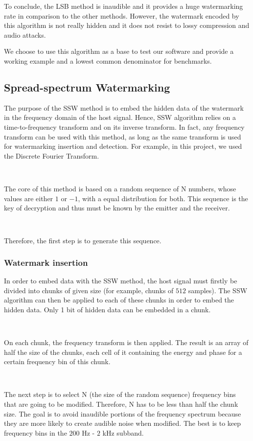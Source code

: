 To conclude, the \ac{LSB} method is inaudible and it provides a huge watermarking rate in comparison to the other methods. However, the watermark encoded by this algorithm is not really hidden and it does not resist to lossy compression and audio attacks.

We choose to use this algorithm as a base to test our software and provide a working example and a lowest common denominator for benchmarks.
\subsection{Spread-spectrum Watermarking}

The purpose of the \ac{SSW} method is to embed the hidden data of the watermark in the frequency domain of the host signal. Hence, \ac{SSW} algorithm relies on a time-to-frequency transform and on its inverse transform. In fact, any frequency transform can be used with this method, as long as the same transform is used for watermarking insertion and detection. For example, in this project, we used the Discrete Fourier Transform.

~

The core of this method is based on a random sequence of N numbers, whose values are either $1$ or $-1$, with a equal distribution for both. This sequence is the key of decryption and thus must be known by the emitter and the receiver.

~

Therefore, the first step is to generate this sequence.

\subsubsection{Watermark insertion}

In order to embed data with the \ac{SSW} method, the host signal must firstly be divided into chunks of given size (for example, chunks of $512$ samples). The \ac{SSW} algorithm can then be applied to each of these chunks in order to embed the hidden data. Only 1 bit of hidden data can be embedded in a chunk.

~

On each chunk, the frequency transform is then applied. The result is an array of half the size of the chunks, each cell of it containing the energy and phase for a certain frequency bin of this chunk.

~

The next step is to select N (the size of the random sequence) frequency bins that are going to be modified. Therefore, N has to be less than half the chunk size. The goal is to avoid inaudible portions of the frequency spectrum because they are more likely to create audible noise when modified. The best is to keep frequency bins in the $200$ Hz - $2$ kHz subband.

